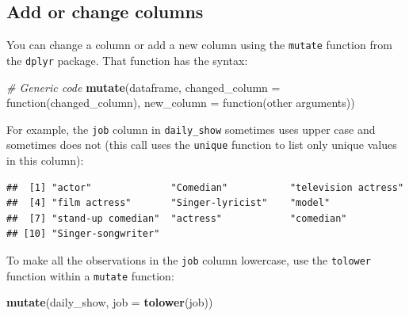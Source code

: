 \documentclass[]{book}
\makeatletter
\newenvironment{Shaded}{\begin{snugshade}}{\end{snugshade}}
\newcommand{\KeywordTok}[1]{\textcolor[rgb]{0.13,0.29,0.53}{\textbf{{#1}}}}
\newcommand{\DataTypeTok}[1]{\textcolor[rgb]{0.13,0.29,0.53}{{#1}}}
\newcommand{\DecValTok}[1]{\textcolor[rgb]{0.00,0.00,0.81}{{#1}}}
\newcommand{\CommentTok}[1]{\textcolor[rgb]{0.56,0.35,0.01}{\textit{{#1}}}}
\newcommand{\NormalTok}[1]{{#1}}
\newenvironment{kframe}{%
\medskip{}
\setlength{\fboxsep}{.8em}
 \def\at@end@of@kframe{}%
 \ifinner\ifhmode%
  \def\at@end@of@kframe{\end{minipage}}%
  \begin{minipage}{\columnwidth}%
 \fi\fi%
 \def\FrameCommand##1{\hskip\@totalleftmargin \hskip-\fboxsep
 \colorbox{shadecolor}{##1}\hskip-\fboxsep
     \hskip-\linewidth \hskip-\@totalleftmargin \hskip\columnwidth}%
 \MakeFramed {\advance\hsize-\width
   \@totalleftmargin\z@ \linewidth\hsize
   \@setminipage}}%
 {\par\unskip\endMakeFramed%
 \at@end@of@kframe}
\renewenvironment{Shaded}{\begin{kframe}}{\end{kframe}}
\makeatother
\begin{document}
\subsection{Add or change columns}\label{add-or-change-columns}

You can change a column or add a new column using the \texttt{mutate}
function from the \texttt{dplyr} package. That function has the syntax:

\begin{Shaded}
\begin{Highlighting}[]
\CommentTok{# Generic code}
\KeywordTok{mutate}\NormalTok{(dataframe,}
       \DataTypeTok{changed_column =} \NormalTok{function(changed_column),}
       \DataTypeTok{new_column =} \NormalTok{function(other arguments))}
\end{Highlighting}
\end{Shaded}

For example, the \texttt{job} column in \texttt{daily\_show} sometimes
uses upper case and sometimes does not (this call uses the
\texttt{unique} function to list only unique values in this column):

\begin{Shaded}
\end{Shaded}

\begin{verbatim}
##  [1] "actor"              "Comedian"           "television actress"
##  [4] "film actress"       "Singer-lyricist"    "model"             
##  [7] "stand-up comedian"  "actress"            "comedian"          
## [10] "Singer-songwriter"
\end{verbatim}

To make all the observations in the \texttt{job} column lowercase, use
the \texttt{tolower} function within a \texttt{mutate} function:

\begin{Shaded}
\begin{Highlighting}[]
\KeywordTok{mutate}\NormalTok{(daily_show, }\DataTypeTok{job =} \KeywordTok{tolower}\NormalTok{(job))}
\end{Highlighting}
\end{Shaded}
\end{document}
